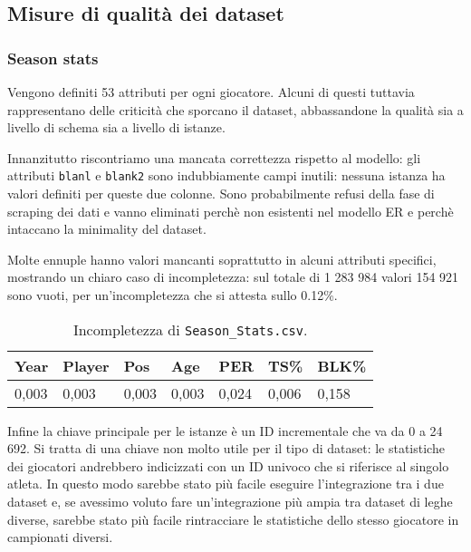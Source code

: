 \subsection{Misure di qualità dei dataset}

\subsubsection{Season stats}

Vengono definiti 53 attributi per ogni giocatore. Alcuni di questi tuttavia rappresentano delle criticità che sporcano il dataset, abbassandone la qualità sia a livello di schema sia a livello di istanze.
\par
Innanzitutto riscontriamo una mancata correttezza rispetto al modello: gli attributi \texttt{blanl} e \texttt{blank2} sono indubbiamente campi inutili: nessuna istanza ha valori definiti per queste due colonne. Sono probabilmente refusi della fase di scraping dei dati e vanno eliminati perchè non esistenti nel modello ER e perchè intaccano la minimality del dataset.
\par
Molte ennuple hanno valori mancanti soprattutto in alcuni attributi specifici, mostrando un chiaro caso di incompletezza: sul totale di 1 283 984 valori 154 921 sono vuoti, per un'incompletezza che si attesta sullo 0.12\%.

\begin{center}
	\begin{longtable}[m]{|m{3em} m{3em} m{3em} m{3em} m{3em} m{3em} m{3em}|} 

		\caption{Incompletezza di \texttt{Season\_Stats.csv}.\label{long}}\\
		\hline
		\bfseries{Year} & \bfseries{Player} & \bfseries{Pos} & \bfseries{Age} & \bfseries{PER} & \bfseries{TS\%} & \bfseries{BLK\%} \\ 
		\hline
		0,003 & 0,003 & 0,003 & 0,003 & 0,024 & 0,006 & 0,158 \\
		\hline
	\end{longtable}
\end{center}

Infine la chiave principale per le istanze è un ID incrementale che va da 0 a 24 692. Si tratta di una chiave non molto utile per il tipo di dataset: le statistiche dei giocatori andrebbero indicizzati con un ID univoco che si riferisce al singolo atleta. In questo modo sarebbe stato più facile eseguire l'integrazione tra i due dataset e, se avessimo voluto fare un'integrazione più ampia tra dataset di leghe diverse, sarebbe stato più facile rintracciare le statistiche dello stesso giocatore in campionati diversi.

